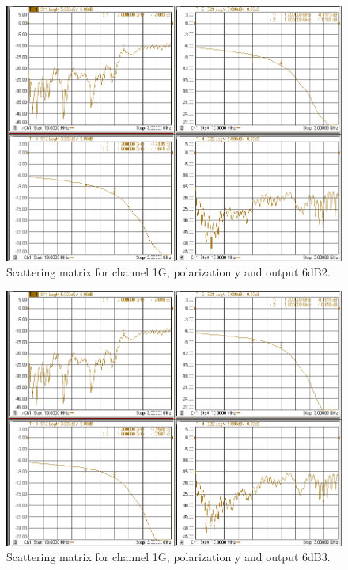 \documentclass[12pt,a4paper,oneside]{article}
\begin{document}
\begin{figure}[H]
\centering
\includegraphics[width=0.9\linewidth]{VNA_results/1Gy_6dB2.png}
\caption{Scattering matrix for channel 1G, polarization y and output 6dB2.}
\label{fig:1Gy_6dB2}
\end{figure}


\begin{figure}[H]
\centering
\includegraphics[width=0.9\linewidth]{VNA_results/1Gy_6dB3.png}
\caption{Scattering matrix for channel 1G, polarization y and output 6dB3.}
\label{fig:1Gy_6dB3}
\end{figure}
\end{document}
